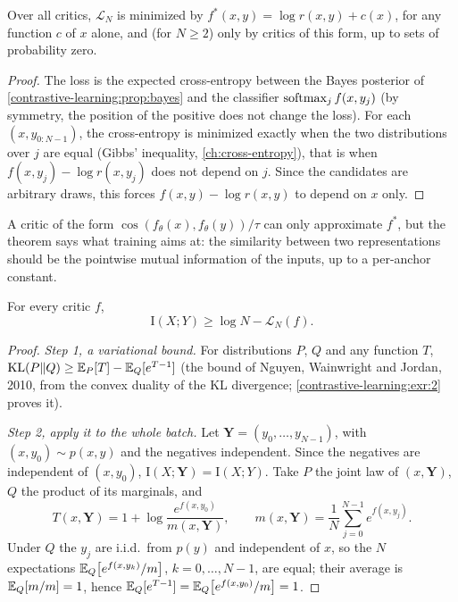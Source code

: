 \begin{notechapter}
\begin{theorem}\label{contrastive-learning:thm:critic}
Over all critics, $\mathcal L_N$ is minimized by $f^*(x, y) = \log r(x, y) + c(x)$, for any function $c$ of $x$ alone, and (for $N\geq2$) only by
critics of this form, up to sets of probability zero.
\end{theorem}

\begin{proof}
The loss is the expected cross-entropy between the Bayes posterior of
\cref{contrastive-learning:prop:bayes} and the classifier $\operatorname{softmax}_jf(x, y_j)$ (by symmetry, the position of the positive
does not change the loss). For each $(x, y_{0:N-1})$, the cross-entropy is minimized exactly when the two
distributions over $j$ are equal (Gibbs' inequality, \cref{ch:cross-entropy}), that is when $f(x, y_j) - \log r(x, y_j)$ does not
depend on $j$. Since the candidates are arbitrary draws, this forces $f(x, y) - \log r(x, y)$ to depend on $x$ only.
\end{proof}

A critic of the form $\cos(f_\theta(x), f_\theta(y))/\tau$ can only approximate $f^*$, but the theorem says what training aims at: the
similarity between two representations should be the pointwise mutual information of the
inputs, up to a per-anchor constant.

\begin{theorem}\label{contrastive-learning:thm:bound}
For every critic $f$,
\[
  \mathrm I(X; Y)\geq\log N - \mathcal L_N(f) .
\]
\end{theorem}

\begin{proof}
\emph{Step 1, a variational bound.} For distributions $P$, $Q$ and any function $T$,
$\mathrm{KL}(P\Vert Q)\geq\mathbb{E}_P[T] - \mathbb{E}_Q[e^{T-1}]$ (the bound of Nguyen, Wainwright and Jordan, 2010, from the convex
duality of the KL divergence; \cref{contrastive-learning:exr:2} proves it).

\emph{Step 2, apply it to the whole batch.} Let $\mathbf Y = (y_0,\dots,y_{N-1})$, with $(x, y_0)\sim p(x, y)$ and the negatives
independent. Since the negatives are independent of $(x, y_0)$, $\mathrm I(X;\mathbf Y) = \mathrm I(X; Y)$. Take $P$ the joint law of $(x, \mathbf Y)$, $Q$
the product of its marginals, and
\[
  T(x,\mathbf Y) = 1 + \log\frac{e^{f(x, y_0)}}{m(x,\mathbf Y)},\qquad m(x,\mathbf Y) = \frac1N\sum_{j=0}^{N-1}e^{f(x, y_j)} .
\]
Under $Q$ the $y_j$ are i.i.d.\ from $p(y)$ and independent of $x$, so the $N$ expectations $\mathbb{E}_Q\bigl[e^{f(x, y_k)}/m\bigr]$, $k = 0,\dots,N-1$,
are equal; their average is $\mathbb{E}_Q[m/m] = 1$, hence $\mathbb{E}_Q[e^{T-1}] = \mathbb{E}_Q\bigl[e^{f(x, y_0)}/m\bigr] = 1$.


\end{proof}
\end{notechapter}

